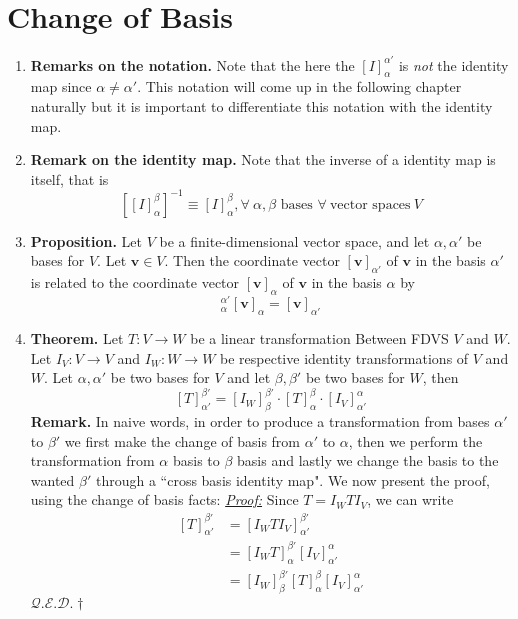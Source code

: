 \documentclass[oneside, 12pt]{book}
\newcommand{\settag}[1]{\renewcommand{\theenumi}{#1}}
\newcommand{\qed}{\hfill $\mathcal{Q}.\mathcal{E}.\mathcal{D}.\dagger$}
\newcommand{\tbf}[1]{\textbf{#1}}
\newcommand{\tit}[1]{\textit{#1}}
\newcommand{\proof}{\tit{\underline{Proof:}}} %
\newcommand{\trans}[3]{$#1:#2\rightarrow{}#3$}
\newcommand{\map}[3]{\text{$\left[#1\right]_{#2}^{#3}$}}
\newcommand{\para}[1]{\item \tbf{#1}}
\newcommand{\vv}{\mathbf{v}}
\begin{document}
\section{Change of Basis}
\begin{enumerate}
    \settag{2.7.2}
    \para{Remarks on the notation.} Note that the here the $[I]_\alpha^{\alpha'}$ is \textit{not} the identity map since $\alpha \neq \alpha'$. This notation will come up in the following chapter naturally but it is important to differentiate this notation with the identity map.
    
    \settag{2.7.*}
    \para{Remark on the identity map.} Note that the inverse of a identity map is itself, that is
    \begin{equation*}
        \left[\map{I}{\alpha}{\beta}\right]^{-1} \equiv \map{I}{\alpha}{\beta}, \forall~\text{$\alpha,\beta$ bases $\forall~\text{vector spaces}~V$}
    \end{equation*}
    
    \settag{2.7.3}
    \para{Proposition.} Let $V$ be a finite-dimensional vector space, and let $\alpha, \alpha'$ be bases for $V$. Let $\vv \in V$. Then the coordinate vector $[\vv]_{\alpha'}$ of $\vv$ in the basis $\alpha'$ is related to the coordinate vector $[\vv]_\alpha$ of $\vv$ in the basis $\alpha$ by
    \begin{equation*}
        [I]_\alpha^{\alpha'}[\vv]_\alpha = [\vv]_{\alpha'}
    \end{equation*}
    
    \settag{2.7.5}
    \para{Theorem.} Let \trans{T}{V}{W} be a linear transformation Between FDVS $V$ and $W$. Let \trans{I_V}{V}{V} and \trans{I_W}{W}{W} be respective identity transformations of $V$ and $W$. Let $\alpha, \alpha'$ be two bases for $V$ and let $\beta, \beta'$ be two bases for $W$, then
    \begin{equation*}
        \map{T}{\alpha'}{\beta'} = \map{I_W}{\beta}{\beta'}\cdot \map{T}{\alpha}{\beta}\cdot \map{I_V}{\alpha'}{\alpha}
    \end{equation*}
    \textbf{Remark.} In naive words, in order to produce a transformation from bases $\alpha'$ to $\beta'$ we first make the change of basis from $\alpha'$ to $\alpha$, then we perform the transformation from $\alpha$ basis to $\beta$ basis and lastly we change the basis to the wanted $\beta'$ through a ``cross basis identity map". \newline
    We now present the proof, using the change of basis facts: \newline
    \proof \newline
    Since $T = I_WTI_V$, we can write
    \begin{align*}
        \map{T}{\alpha'}{\beta'} &= \map{I_WTI_V}{\alpha'}{\beta'} \\
        &= \map{I_WT}{\alpha}{\beta'}\map{I_V}{\alpha'}{\alpha} \\
        &= \map{I_W}{\beta}{\beta'}\map{T}{\alpha}{\beta} \map{I_V}{\alpha'}{\alpha}
    \end{align*}
    \qed
    

\end{enumerate}
\end{document}
